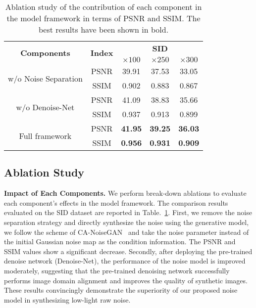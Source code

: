 \documentclass[10pt,twocolumn,letterpaper]{article}
\begin{document}
\begin{table}[t]
\centering
\caption{Ablation study of the contribution of each component in the model framework in terms of PSNR and SSIM. The best results have been shown in bold.}
\vspace{2pt}
\begin{tabular}{c|c|c|c|c}
\hline
\multirow{2}{*}{\textbf{Components}} & \multirow{2}{*}{\textbf{Index}} & \multicolumn{3}{c}{\textbf{SID}} \\\cline{3-5}
& & \textbf{$\times100$} & \textbf{$\times250$} & \textbf{$\times300$} \\ \hline
\multirow{2}{*}{w/o Noise Separation} & PSNR &39.91 &37.53 &33.05 \\ \cline{2-5}
& SSIM &0.902 &0.883 &0.867  \\ \hline
\multirow{2}{*}{w/o Denoise-Net} & PSNR &41.09 &38.83 &35.66 \\ \cline{2-5}
& SSIM &0.937 &0.913 &0.899  \\ \hline
\multirow{2}{*}{Full framework} & PSNR &\textbf{41.95} &\textbf{39.25} &\textbf{36.03} \\ \cline{2-5}
& SSIM &\textbf{0.956} &\textbf{0.931} &\textbf{0.909}\\\hline
\end{tabular}
\label{table:ablation2}
\vspace{-2ex}
\end{table}

\vspace{-0.5em}
\subsection{Ablation Study}
\label{ablation}
\vspace{-0.5em}
\textbf{Impact of Each Components.} We perform break-down ablations to evaluate each component's effects in the model framework. The comparison results evaluated on the SID dataset are reported in Table.~\ref{table:ablation2}. First, we remove the noise separation strategy and directly synthesize the noise using the generative model, we follow the scheme of CA-NoiseGAN~\cite{chang2020learning} and take the noise parameter instead of the initial Gaussian noise map as the condition information. The PSNR and SSIM values show a significant decrease. Secondly, after deploying the pre-trained denoise network (Denoise-Net), the performance of the noise model is improved moderately, suggesting that the pre-trained denoising network successfully performs image domain alignment and improves the quality of synthetic images. These results convincingly demonstrate the superiority of our proposed noise model in synthesizing low-light raw noise.
\end{document}
